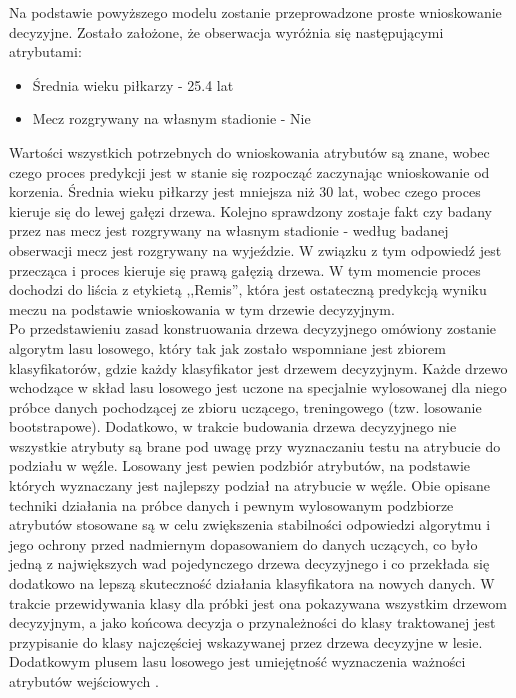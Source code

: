 Na podstawie powyższego modelu zostanie przeprowadzone proste wnioskowanie decyzyjne. Zostało założone, że obserwacja wyróżnia się następującymi atrybutami:
\begin{itemize}
    \item Średnia wieku piłkarzy - 25.4 lat
    \item Mecz rozgrywany na własnym stadionie - Nie
\end{itemize}
Wartości wszystkich potrzebnych do wnioskowania atrybutów są znane, wobec czego proces predykcji jest w stanie się rozpocząć zaczynając wnioskowanie od korzenia. Średnia wieku piłkarzy jest mniejsza niż 30 lat, wobec czego proces kieruje się do lewej gałęzi drzewa. Kolejno sprawdzony zostaje fakt czy badany przez nas mecz jest rozgrywany na własnym stadionie - według badanej obserwacji mecz jest rozgrywany na wyjeździe. W związku z tym odpowiedź jest przecząca i proces kieruje się prawą gałęzią drzewa. W tym momencie proces dochodzi do liścia z etykietą ,,Remis'', która jest ostateczną predykcją wyniku meczu na podstawie wnioskowania w tym drzewie decyzyjnym.\\

Po przedstawieniu zasad konstruowania drzewa decyzyjnego omówiony zostanie algorytm lasu losowego, który tak jak zostało wspomniane jest zbiorem klasyfikatorów, gdzie każdy klasyfikator jest drzewem decyzyjnym. Każde drzewo wchodzące w skład lasu losowego jest uczone na specjalnie wylosowanej dla niego próbce danych pochodzącej ze zbioru uczącego, treningowego (tzw. losowanie bootstrapowe). Dodatkowo, w trakcie budowania drzewa decyzyjnego nie wszystkie atrybuty są brane pod uwagę przy wyznaczaniu testu na atrybucie do podziału w węźle. Losowany jest pewien podzbiór atrybutów, na podstawie których wyznaczany jest najlepszy podział na atrybucie w węźle. Obie opisane techniki działania na próbce danych i pewnym wylosowanym podzbiorze atrybutów stosowane są w celu zwiększenia stabilności odpowiedzi algorytmu i jego ochrony przed nadmiernym dopasowaniem do danych uczących, co było jedną z największych wad pojedynczego drzewa decyzyjnego i co przekłada się dodatkowo na lepszą skuteczność działania klasyfikatora na nowych danych. W trakcie przewidywania klasy dla próbki jest ona pokazywana wszystkim drzewom decyzyjnym, a jako końcowa decyzja o przynależności do klasy traktowanej jest przypisanie do klasy najczęściej wskazywanej przez drzewa decyzyjne w lesie. Dodatkowym plusem lasu losowego jest umiejętność wyznaczenia ważności atrybutów wejściowych \cite{PPlonski}. \\

